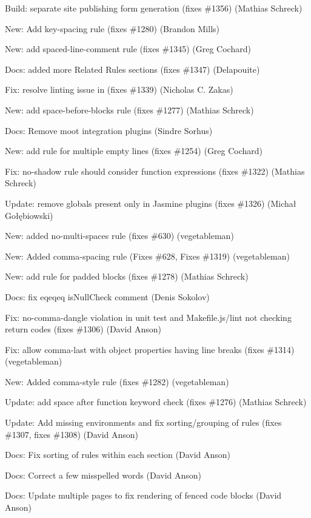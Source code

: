 \begin{DoxyItemize}
\item Build\+: separate site publishing form generation (fixes \#1356) (Mathias Schreck)
\item New\+: Add key-\/spacing rule (fixes \#1280) (Brandon Mills)
\item New\+: add spaced-\/line-\/comment rule (fixes \#1345) (Greg Cochard)
\item Docs\+: added more Related Rules sections (fixes \#1347) (Delapouite)
\item Fix\+: resolve linting issue in (fixes \#1339) (Nicholas C. Zakas)
\item New\+: add space-\/before-\/blocks rule (fixes \#1277) (Mathias Schreck)
\item Docs\+: Remove moot integration plugins (Sindre Sorhus)
\item New\+: add rule for multiple empty lines (fixes \#1254) (Greg Cochard)
\item Fix\+: no-\/shadow rule should consider function expressions (fixes \#1322) (Mathias Schreck)
\item Update\+: remove globals present only in Jasmine plugins (fixes \#1326) (Michał Gołębiowski)
\item New\+: added no-\/multi-\/spaces rule (fixes \#630) (vegetableman)
\item New\+: Added comma-\/spacing rule (Fixes \#628, Fixes \#1319) (vegetableman)
\item New\+: add rule for padded blocks (fixes \#1278) (Mathias Schreck)
\item Docs\+: fix eqeqeq is\+Null\+Check comment (Denis Sokolov)
\item Fix\+: no-\/comma-\/dangle violation in unit test and Makefile.\+js/lint not checking return codes (fixes \#1306) (David Anson)
\item Fix\+: allow comma-\/last with object properties having line breaks (fixes \#1314) (vegetableman)
\item New\+: Added comma-\/style rule (fixes \#1282) (vegetableman)
\item Update\+: add space after function keyword check (fixes \#1276) (Mathias Schreck)
\item Update\+: Add missing environments and fix sorting/grouping of rules (fixes \#1307, fixes \#1308) (David Anson)
\item Docs\+: Fix sorting of rules within each section (David Anson)
\item Docs\+: Correct a few misspelled words (David Anson)
\item Docs\+: Update multiple pages to fix rendering of fenced code blocks (David Anson)

\end{DoxyItemize}
